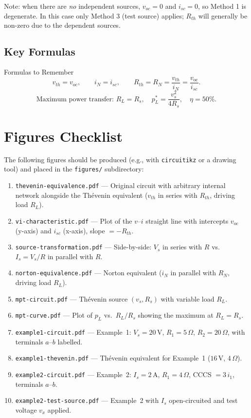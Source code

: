 \documentclass[twoside]{article}
\begin{document}
\noindent Note: when there are \emph{no} independent sources, $v_{oc} = 0$ and $i_{sc} = 0$, so Method 1 is degenerate.  In this case only Method 3 (test source) applies; $R_{th}$ will generally be non-zero due to the dependent sources.

\subsection{Key Formulas}

\begin{cyanbox}{Formulas to Remember}
\[
    v_{th} = v_{\mathrm{oc}}, \qquad
    i_N    = i_{sc}, \qquad
    R_{th} = R_N    = \frac{v_{th}}{i_N} = \frac{v_{\mathrm{oc}}}{i_{sc}}.
\]
\[
    \text{Maximum power transfer: } R_L = R_s,\quad
    p_L^{*} = \frac{v_s^2}{4R_s},\quad \eta = 50\%.
\]
\end{cyanbox}

\section*{Figures Checklist}

The following figures should be produced (e.g., with \texttt{circuitikz} or a drawing tool) and placed in the \texttt{figures/} subdirectory:

\begin{enumerate}
    \item \texttt{thevenin-equivalence.pdf} — Original circuit with arbitrary internal network alongside the Th\'{e}venin equivalent ($v_{th}$ in series with $R_{th}$, driving load $R_L$).
    \item \texttt{vi-characteristic.pdf} — Plot of the $v$--$i$ straight line with intercepts $v_{\mathrm{oc}}$ (y-axis) and $i_{sc}$ (x-axis), slope $= -R_{th}$.
    \item \texttt{source-transformation.pdf} — Side-by-side: $V_s$ in series with $R$ vs.\ $I_s = V_s/R$ in parallel with $R$.
    \item \texttt{norton-equivalence.pdf} — Norton equivalent ($i_N$ in parallel with $R_N$, driving load $R_L$).
    \item \texttt{mpt-circuit.pdf} — Th\'{e}venin source $(v_s, R_s)$ with variable load $R_L$.
    \item \texttt{mpt-curve.pdf} — Plot of $p_L$ vs.\ $R_L/R_s$ showing the maximum at $R_L = R_s$.
    \item \texttt{example1-circuit.pdf} — Example~1: $V_s = 20\,\mathrm{V}$, $R_1 = 5\,\Omega$, $R_2 = 20\,\Omega$, with terminals $a$--$b$ labelled.
    \item \texttt{example1-thevenin.pdf} — Th\'{e}venin equivalent for Example~1 ($16\,\mathrm{V}$, $4\,\Omega$).
    \item \texttt{example2-circuit.pdf} — Example~2: $I_s = 2\,\mathrm{A}$, $R_1 = 4\,\Omega$, CCCS $= 3\,i_1$, terminals $a$--$b$.
    \item \texttt{example2-test-source.pdf} — Example~2 with $I_s$ open-circuited and test voltage $v_x$ applied.
\end{enumerate}
\end{document}
